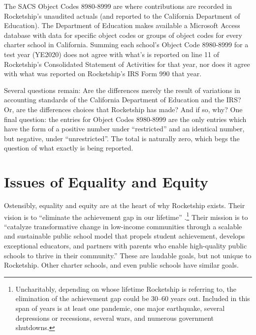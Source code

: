 \begin{itemize}
  The SACS Object Codes 8980-8999 are where contributions are recorded in Rocketship's unaudited actuals (and reported to the California Department of Education). The Department of Education makes available a Microsoft Access database with data for specific object codes or groups of object codes for every charter school in California. Summing each school's Object Code 8980-8999 for a test year (YE2020) does not agree with what's is reported on line 11 of Rocketship's Consolidated Statement of Activities for that year, nor does it agree with what was reported on Rocketship's IRS Form 990 that year.

  Several questions remain: Are the differences merely the result of variations in accounting standards of the California Department of Education and the IRS\@? Or, are the differences choices that Rocketship has made? And if so, why? One final question: the entries for Object Codes 8980-8999 are the only entries which have the form of a positive number under ``restricted'' and an identical number, but negative, under ``unrestricted''. The total is naturally zero, which begs the question of what exactly is being reported.

\end{itemize}

\section{Issues of Equality and Equity}%
\label{sec:issues_equality_equity}\indent%

Ostensibly, equality and equity are at the heart of why Rocketship exists. Their vision is to ``eliminate the achievement gap in our lifetime'' \parencite{RSE2017}.\footnote{Uncharitably, depending on whose lifetime Rocketship is referring to, the elimination of the achievement gap could be 30–60 years out. Included in this span of years is at least one pandemic, one major earthquake, several depressions or recessions, several wars, and numerous government shutdowns.} Their mission is to ``catalyze transformative change in low-income communities through a scalable and sustainable public school model that propels student achievement, develops exceptional educators, and partners with parents who enable high-quality public schools to thrive in their community.'' \parencite{RSE2017} These are laudable goals, but not unique to Rocketship. Other charter schools, and even public schools have similar goals.

